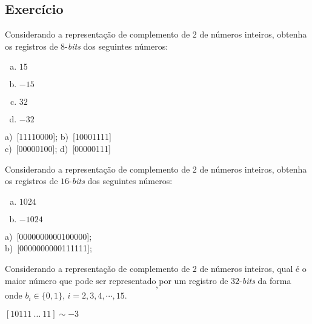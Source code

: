 
\subsection*{Exercício}

\begin{exer}
  Considerando a representação de complemento de 2 de números inteiros, obtenha os registros de $8$-{\it bits} dos seguintes números:
  \begin{enumerate}[a)]
  \item $15$
  \item $-15$
  \item $32$
  \item $-32$
  \end{enumerate}
\end{exer}
\begin{resp}

    a)~[11110000]; b)~[10001111]\\
    c)~[00000100]; d)~[00000111]
\end{resp}

\begin{exer}
  Considerando a representação de complemento de 2 de números inteiros, obtenha os registros de $16$-{\it bits} dos seguintes números:
  \begin{enumerate}[a)]
  \item $1024$
  \item $-1024$
  \end{enumerate}
\end{exer}
\begin{resp}
    a)~[0000000000100000]; \\
    b)~[0000000000111111];
\end{resp}

\begin{exer}
  Considerando a representação de complemento de 2 de números inteiros, qual é o maior número que pode ser representado por um registro de $32$-{\it bits} da forma
  \begin{equation}
    [1 ~ 0 ~ b_2 ~ b_3 ~ b_4 ~ \cdots ~ b_{30} ~ 1],
  \end{equation}
onde $b_i \in \{0, 1\}$, $i=2, 3, 4, \cdots, 15$.
\end{exer}
\begin{resp}
  $[10111~\ldots~11] \sim -3$
\end{resp}

